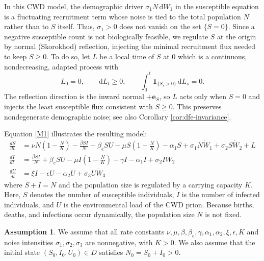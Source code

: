 \documentclass[12pt,a4paper,reqno]{amsart}
\theoremstyle{definition}
\newtheorem{assumption}[theorem]{Assumption}
\theoremstyle{remark}
\theoremstyle{plain}
\providecommand{\dif}{\mathrm{d}}
\providecommand{\indic}{\mathbf{1}}
\begin{document}
In this CWD model, the demographic driver $\sigma_{1}N\,\dif W_{1}$ in the susceptible equation is a fluctuating recruitment term whose noise is tied to the total population $N$ rather than to $S$ itself. Thus, $\sigma_{1}>0$ does not vanish on the set $\{S=0\}$. Since a negative susceptible count is not biologically feasible, we regulate $S$ at the origin by normal (Skorokhod) reflection, injecting the minimal recruitment flux needed to keep $S\geq 0$. To do so, let $L$ be a local time of $S$ at $0$ which is a continuous, nondecreasing, adapted process with
\begin{equation}\label{eq:localtime}
L_{0}=0,\qquad \dif L_{t}\ge 0,\qquad
\int_{0}^{t}\indic_{\{S_{s}>0\}}\,\dif L_{s}=0 .
\end{equation}
The reflection direction is the inward normal $+\mathbf{e}_{S}$, so $L$ acts only when $S=0$ and injects the least susceptible flux consistent with $S\ge 0$.  This preserves nondegenerate demographic noise; see also Corollary \ref{cor:dfe-invariance}.

Equation \eqref{M1} illustrates the resulting model:
\begin{align}\label{M1}
\frac{dS}{dt} &= \nu N\left(1-\frac{N}{K}\right) - \frac{\beta S I}{N} - \beta_e S U - \mu S\left(1-\frac{N}{K}\right) - \alpha_1 S + \sigma_1 N \dot{W}_1 + \sigma_2 S \dot{W}_2 + \dot{L} \nonumber\\
\frac{dI}{dt} &= \frac{\beta S I}{N} + \beta_e S U - \mu I\left(1-\frac{N}{K}\right) - \gamma I - \alpha_1 I + \sigma_2 I \dot{W}_2 \\
\frac{dU}{dt} &= \xi I - \epsilon U - \alpha_2 U + \sigma_3 U \dot{W}_3 \nonumber
\end{align}
where $S+I=N$ and the population size is regulated by a carrying capacity $K$. Here, $S$ denotes the number of susceptible individuals, $I$ is the number of infected individuals, and $U$ is the environmental load of the CWD prion. Because births, deaths, and infections occur dynamically, the population size $N$ is not fixed. 

\begin{assumption}\label{ass:params}
We assume that all rate constants $\nu,\mu,\beta,\beta_{e},\gamma,\alpha_{1},\alpha_{2},
\xi,\epsilon,K$ and noise intensities $\sigma_{1},\sigma_{2},\sigma_{3}$ are
nonnegative, with $K>0$. We also assume that the initial state $(S_{0},I_{0},U_{0})\in D$ satisfies $N_{0}=S_{0}+I_{0}>0$.
\end{assumption}

\end{document}
